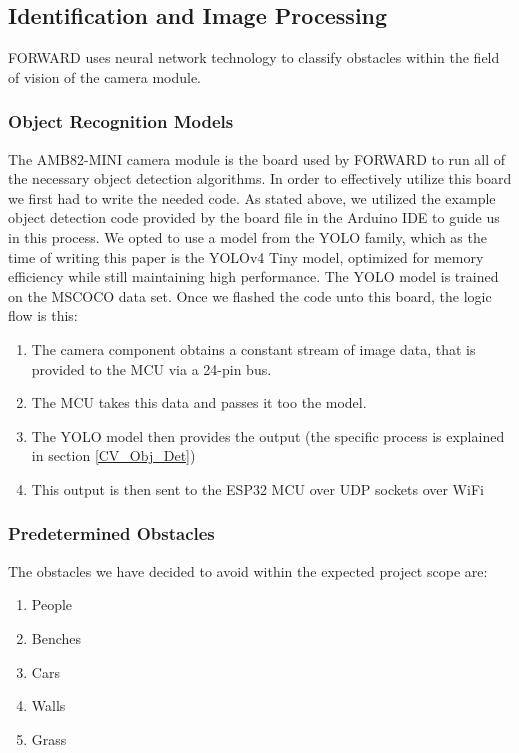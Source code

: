\subsection{Identification and Image Processing}
\noindent FORWARD uses neural network technology to classify obstacles within the field of vision of the camera module.

\subsubsection{Object Recognition Models}

\noindent The AMB82-MINI camera module is the board used by FORWARD to run all of the necessary object detection algorithms. In order to effectively utilize this board we first had to write the needed code. As stated above, we utilized the example object detection code provided by the board file in the Arduino IDE to guide us in this process. We opted to use a model from the YOLO family, which as the time of writing this paper is the YOLOv4 Tiny model, optimized for memory efficiency while still maintaining high performance. The YOLO model is trained on the MSCOCO data set. Once we flashed the code unto this board, the logic flow is this: 

\begin{enumerate}
	\item The camera component obtains a constant stream of image data, that is provided to the MCU via a 24-pin bus.
	\item The MCU takes this data and passes it too the model.
	\item The YOLO model then provides the output (the specific process is explained in section \ref{CV_Obj_Det})
	\item This output is then sent to the ESP32 MCU over UDP sockets over WiFi
\end{enumerate}
 

\subsubsection{Predetermined Obstacles}
\noindent The obstacles we have decided to avoid within the expected project scope are:
\begin{enumerate}
	\item People
	\item Benches
	\item Cars
	\item Walls
	\item Grass
\end{enumerate}

